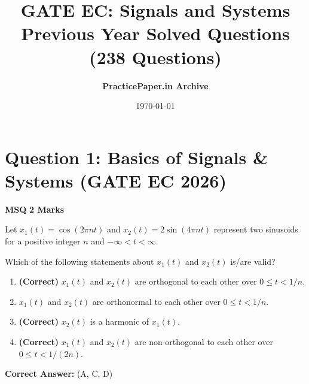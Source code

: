 \documentclass[11pt,a4paper]{article}
\title{\Huge\bfseries GATE EC: Signals and Systems\\[0.3em] \Large Previous Year Solved Questions (238 Questions)}
\author{\textbf{PracticePaper.in Archive}}
\date{\today}
\begin{document}
\maketitle
\tableofcontents
\newpage


\section*{Question 1: Basics of Signals \& Systems (GATE EC 2026)}
\noindent \textbf{\color{primary}MSQ} \hfill \textbf{\color{secondary}2 Marks}


\noindent Let $x_1(t) = \cos(2\pi nt)$ and $x_2(t) = 2\sin(4\pi nt)$ represent two sinusoids for a positive integer $n$ and $-\infty < t < \infty$. 

Which of the following statements about $x_1(t)$ and $x_2(t)$ is/are valid?


\begin{enumerate}[label=(\Alph*)]
    \item \textbf{(Correct)} $x_1(t)$ and $x_2(t)$ are orthogonal to each other over $0 \le t < 1/n$.
    \item $x_1(t)$ and $x_2(t)$ are orthonormal to each other over $0 \le t < 1/n$.
    \item \textbf{(Correct)} $x_2(t)$ is a harmonic of $x_1(t)$.
    \item \textbf{(Correct)} $x_1(t)$ and $x_2(t)$ are non-orthogonal to each other over $0 \le t < 1/(2n)$.
\end{enumerate}

\noindent \textbf{Correct Answer:} (A, C, D)
\end{document}
